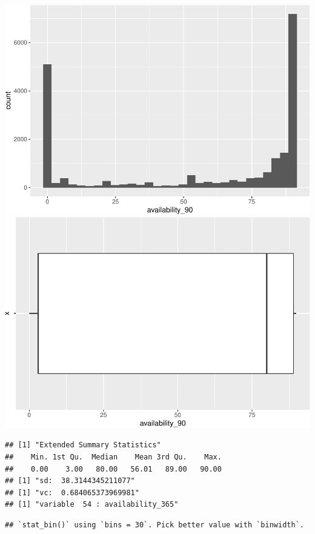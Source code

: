 \includegraphics{anal_files/figure-latex/unnamed-chunk-9-32.pdf}
\includegraphics{anal_files/figure-latex/unnamed-chunk-9-33.pdf}

\begin{verbatim}
## [1] "Extended Summary Statistics"
##    Min. 1st Qu.  Median    Mean 3rd Qu.    Max. 
##    0.00    3.00   80.00   56.01   89.00   90.00 
## [1] "sd:  38.3144345211077"
## [1] "vc:  0.684065373969981"
## [1] "variable  54 : availability_365"
\end{verbatim}

\begin{verbatim}
## `stat_bin()` using `bins = 30`. Pick better value with `binwidth`.
\end{verbatim}


